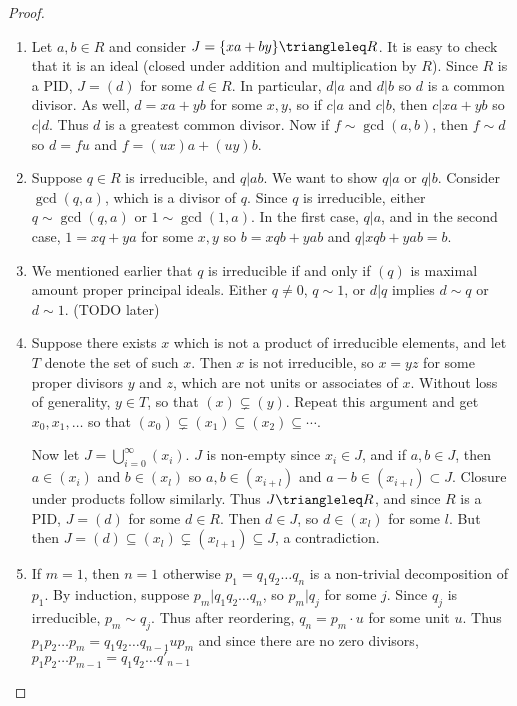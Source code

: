 \documentclass[12pt, a4paper]{book}
\theoremstyle{nonumberplain}
\newtheorem{proof}{Proof}
\begin{document}
\begin{proof}
    \begin{enumerate}
        \item Let $a,b\in R$ and consider $J=\{xa+by\}\triangleleq R$.
            It is easy to check that it is an ideal (closed under addition and multiplication by $R$).
            Since $R$ is a PID, $J=(d)$ for some $d\in R$.
            In particular, $d|a$ and $d|b$ so $d$ is a common divisor.
            As well, $d=xa+yb$ for some $x,y$, so if $c|a$ and $c|b$, then $c|xa+yb$ so $c|d$.
            Thus $d$ is a greatest common divisor.
            Now if $f\sim\gcd(a,b)$, then $f\sim d$ so $d=fu$ and $f=(ux)a+(uy)b$.
        \item Suppose $q\in R$ is irreducible, and $q|ab$.
            We want to show $q|a$ or $q|b$.
            Consider $\gcd(q,a)$, which is a divisor of $q$.
            Since $q$ is irreducible, either $q\sim\gcd(q,a)$ or $1\sim\gcd(1,a)$.
            In the first case, $q|a$, and in the second case, $1=xq+ya$ for some $x,y$ so $b=xqb+yab$ and $q|xqb+yab=b$.
        \item We mentioned earlier that $q$ is irreducible if and only if $(q)$ is maximal amount proper principal ideals.
            Either $q\neq 0$, $q\sim 1$, or $d|q$ implies $d\sim q$ or $d\sim 1$.
            (TODO later)
        \item Suppose there exists $x$ which is not a product of irreducible elements, and let $T$ denote the set of such $x$.
            Then $x$ is not irreducible, so $x=yz$ for some proper divisors $y$ and $z$, which are not units or associates of $x$.
            Without loss of generality, $y\in T$, so that $(x)\subsetneq(y)$.
            Repeat this argument and get $x_0,x_1,\ldots$ so that $(x_0)\subsetneq(x_1)\subseteq(x_2)\subseteq\cdots$.

            Now let $J=\bigcup_{i=0}^\infty(x_i)$.
            $J$ is non-empty since $x_i\in J$, and if $a,b\in J$, then $a\in(x_i)$ and $b\in(x_l)$ so $a,b\in (x_{i+l})$ and $a-b\in(x_{i+l})\subset J$.
            Closure under products follow similarly.
            Thus $J\triangleleq R$, and since $R$ is a PID, $J=(d)$ for some $d\in R$.
            Then $d\in J$, so $d\in(x_l)$ for some $l$.
            But then $J=(d)\subseteq(x_l)\subsetneq(x_{l+1})\subseteq J$, a contradiction.
        \item If $m=1$, then $n=1$ otherwise $p_1=q_1q_2\ldots q_n$ is a non-trivial decomposition of $p_1$.
            By induction, suppose $p_m|q_1q_2\ldots q_n$, so $p_m|q_j$ for some $j$.
            Since $q_j$ is irreducible, $p_m\sim q_j$.
            Thus after reordering, $q_n=p_m\cdot u$ for some unit $u$.
            Thus $p_1p_2\ldots p_m=q_1q_2\ldots q_{n-1} u p_m$ and since there are no zero divisors, $p_1p_2\ldots p_{m-1}=q_1q_2\ldots q'_{n-1}$
    \end{enumerate}
\end{proof}
\end{document}
